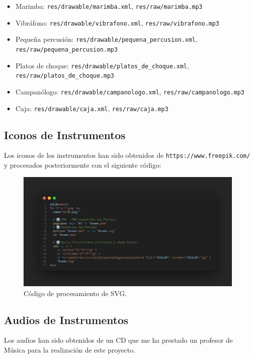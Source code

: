 \documentclass{article}
\newcommand{\instrumentopath}{/home/khz/Documentos/Carrera/MusiKe/instrumentos/svg/}
\newcommand{\instrumento}[1]{\raisebox{-0.6em}{}}
\begin{document}
\begin{itemize}
  \item \instrumento{marimba} Marimba: \texttt{res/drawable/marimba.xml}, \texttt{res/raw/marimba.mp3}
  \item \instrumento{vibrafono} Vibráfono: \texttt{res/drawable/vibrafono.xml}, \texttt{res/raw/vibrafono.mp3}
  \item \instrumento{pequena_percusion} Pequeña percusión: \texttt{res/drawable/pequena\_percusion.xml}, \texttt{res/raw/pequena\_percusion.mp3}
  \item \instrumento{platos_de_choque} Platos de choque: \texttt{res/drawable/platos\_de\_choque.xml}, \texttt{res/raw/platos\_de\_choque.mp3}
  \item \instrumento{campanologo} Campanólogo: \texttt{res/drawable/campanologo.xml}, \texttt{res/raw/campanologo.mp3}
  \item \instrumento{caja} Caja: \texttt{res/drawable/caja.xml}, \texttt{res/raw/caja.mp3}
\end{itemize}
\subsection{Iconos de Instrumentos}

Los iconos de los instrumentos han sido obtenidos de \texttt{https://www.freepik.com/} y procesados posteriormente con el siguiente código:

\begin{figure}[h]
\centering
\includegraphics[width=\textwidth]{svg_codigo.png}
\caption{Código de procesamiento de SVG.}
\end{figure}

\subsection{Audios de Instrumentos}

Los audios han sido obtenidos de un CD que me ha prestado un profesor de Música para la realización de este proyecto.
\end{document}

